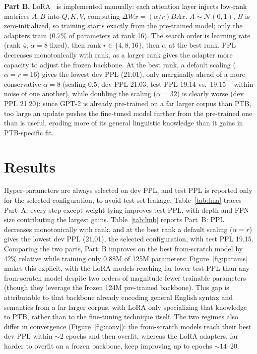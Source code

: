 \documentclass[a4paper]{article}
\begin{document}
\textbf{Part B.} LoRA~\cite{hu2022} is implemented manually: each attention
layer injects low-rank matrices $A,B$ into $Q,K,V$, computing
$\Delta Wx=(\alpha/r)BAx$. $A\sim\mathcal{N}(0,1)$, $B$ is zero-initialized, so
training starts exactly from the pre-trained model; only the adapters train
(0.7\% of parameters at rank 16). The search order is learning rate (rank 4,
$\alpha{=}8$ fixed), then rank $r\in\{4,8,16\}$, then $\alpha$ at the best
rank. PPL decreases monotonically with rank, as a larger rank gives the
adapter more capacity to adjust the frozen backbone. At the best rank, a
default scaling ($\alpha{=}r{=}16$) gives the lowest dev PPL (21.01), only
marginally ahead of a more conservative $\alpha{=}8$ (scaling 0.5, dev PPL
21.03, test PPL 19.14 vs.\ 19.15 -- within noise of one another), while
doubling the scaling ($\alpha{=}32$) is clearly worse (dev PPL 21.20): since
GPT-2 is already pre-trained on a far larger corpus than PTB, too large an
update pushes the fine-tuned model further from the pre-trained one than is
useful, eroding more of its general linguistic knowledge than it gains in
PTB-specific fit.

\section{Results}
Hyper-parameters are always selected on dev PPL, and test PPL is reported
only for the selected configuration, to avoid test-set leakage. Table~\ref{tab:lma}
traces Part~A: every step except weight tying
improves test PPL, with depth and FFN size contributing the largest gains.
Table~\ref{tab:lmb} reports Part~B: PPL decreases monotonically with rank,
and at the best rank a default scaling ($\alpha{=}r$) gives the lowest dev
PPL (21.01), the selected configuration, with test PPL 19.15.
Comparing the two parts, Part~B improves
on the best from-scratch model by 42\% relative while training only 0.88M of
125M parameters: Figure~\ref{fig:params} makes this explicit, with the LoRA
models reaching far lower test PPL than any from-scratch model despite two
orders of magnitude fewer trainable parameters (though they leverage the
frozen 124M pre-trained backbone). This gap is attributable to that backbone
already encoding general English syntax and semantics from a far larger
corpus, with LoRA only specializing that knowledge to PTB, rather than to the
fine-tuning technique itself. The two regimes also differ in convergence
(Figure~\ref{fig:conv}): the from-scratch models reach their best dev PPL
within ${\sim}2$ epochs and then overfit, whereas the LoRA adapters, far
harder to overfit on a frozen backbone, keep improving up to epochs
${\sim}14$--$20$.
\end{document}
